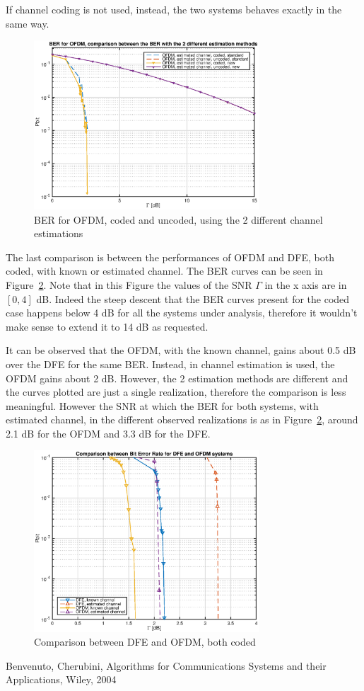 \documentclass[10pt]{article}
\begin{document}
If channel coding is not used, instead, the two systems behaves exactly in the same way.
\begin{figure}[h!]
	\centering
	\includegraphics[width = 0.75\textwidth]{OFDM_BER_est_comparison}
	\caption{BER for OFDM, coded and uncoded, using the 2 different channel estimations}
	\label{fig:BEROFDM_comparison}
\end{figure}

The last comparison is between the performances of OFDM and DFE, both coded, with known or estimated channel. The BER curves can be seen in Figure~\ref{fig:DFEOFDM}. Note that in this Figure the values of the SNR $\Gamma$ in the x axis are in $[0, 4]$ dB. Indeed the steep descent that the BER curves present for the coded case happens below 4 dB for all the systems under analysis, therefore it wouldn't make sense to extend it to 14 dB as requested. 

It can be observed that the OFDM, with the known channel, gains about 0.5 dB over the DFE for the same BER. Instead, in channel estimation is used, the OFDM gains about 2 dB. However, the 2 estimation methods are different and the curves plotted are just a single realization, therefore the comparison is less meaningful. However the SNR at which the BER for both systems, with estimated channel, in the different observed realizations is as in Figure~\ref{fig:DFEOFDM}, around 2.1 dB for the OFDM and 3.3 dB for the DFE.

\begin{figure}[H]
	\centering
	\includegraphics[width = 0.75\textwidth]{OFDMDFE}
	\caption{Comparison between DFE and OFDM, both coded}
	\label{fig:DFEOFDM}
\end{figure}

\FloatBarrier

\begin{thebibliography}{10}

Benvenuto, Cherubini, Algorithms for Communications Systems and their Applications, Wiley, 2004

\end{thebibliography}
\end{document}
